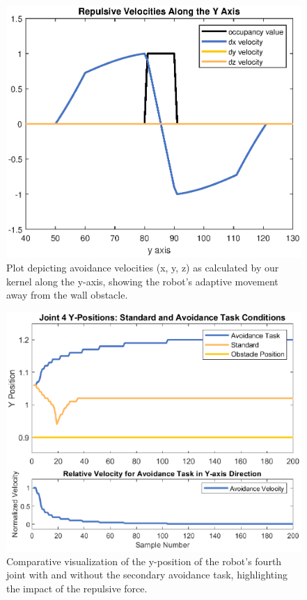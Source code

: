\documentclass[a4paper]{article}
\begin{document}
\begin{figure}[htbp]
	\centering
	\includegraphics[width=1.0\linewidth]{Repulsive-Velocities-Along-the-Y-Axis-wide.eps}
	\caption{Plot depicting avoidance velocities (x, y, z) as calculated by our kernel along the y-axis, showing the robot's adaptive movement away from the wall obstacle.}
\end{figure}

\begin{figure}[htbp]
	\centering
	\includegraphics[width=1.0\linewidth]{Y-Positions.eps}
	\caption{Comparative visualization of the y-position of the robot's fourth joint with and without the secondary avoidance task, highlighting the impact of the repulsive force.}
\end{figure}
\end{document}
